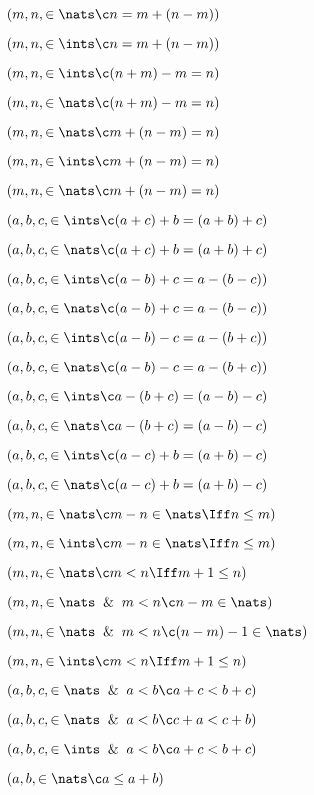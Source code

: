  $(m,n,\in \nats \c n = m + (n - m) )$

 $(m,n,\in \ints \c n = m + (n - m) )$

 $(m,n,\in \ints \c  (n + m)  - m = n)$

 $(m,n,\in \nats \c  (n + m)  - m = n)$

 $(m,n,\in \nats \c  m + (n - m) = n)$

 $(m,n,\in \ints \c m + (n - m) = n )$

 $(m,n,\in \nats \c m + (n - m) = n )$

 $(a,b,c, \in \ints \c (a + c) + b = (a + b) + c)$

 $(a,b,c, \in \nats \c (a + c) + b = (a + b) + c)$

 $(a,b,c, \in\ints \c (a - b) + c = a - (b - c))$

 $(a,b,c, \in\nats \c (a - b) + c = a - (b - c))$

 $(a,b,c, \in\ints \c (a - b) - c = a - (b + c))$

 $(a,b,c, \in\nats \c (a - b) - c = a - (b + c))$

 $(a,b,c, \in\ints \c a - (b + c) = (a - b) - c )$

 $(a,b,c, \in\nats \c a - (b + c) = (a - b) - c )$

 $(a,b,c, \in\ints \c (a - c) + b = (a + b) - c )$

 $(a,b,c, \in\nats \c (a - c) + b = (a + b) - c )$

 $(m,n,\in \nats \c m - n \in \nats
\Iff n \le m)$

 $(m,n,\in \ints \c m - n \in \nats
\Iff n \le m)$

 $(m,n, \in \nats \c m < n \Iff
m + 1 \le n)$

 $(m,n,\in\nats \And m < n \c n - m \in \nats)$

 $(m,n,\in\nats \And m < n \c (n - m) - 1 \in \nats)$

 $(m,n, \in \ints \c m < n \Iff
m + 1 \le n)$

 $(a,b,c, \in \nats \And a < b
\c a + c < b + c)$

 $(a,b,c, \in \nats \And a < b
\c  c + a < c +  b )$

 $(a,b,c, \in \ints \And a < b
\c a + c < b + c)$

 $(a,b, \in \nats \c a \le a + b)$

